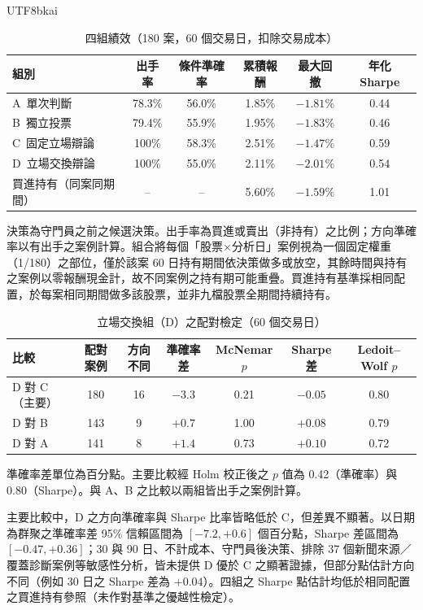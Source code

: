 \documentclass[12pt,a4paper]{article}
\newcommand{\grp}[1]{\textsf{#1}}
\begin{document}
\begin{CJK}{UTF8}{bkai}
\begin{table}[H]
\centering\small
\caption{四組績效（180 案，60 個交易日，扣除交易成本）}
\label{tab:main}
\begin{tabular}{@{}lccccc@{}}
\toprule
組別 & 出手率 & 條件準確率 & 累積報酬 & 最大回撤 & 年化 Sharpe \\
\midrule
\grp{A}\ 單次判斷 & 78.3\% & 56.0\% & 1.85\% & $-1.81\%$ & 0.44 \\
\grp{B}\ 獨立投票 & 79.4\% & 55.9\% & 1.95\% & $-1.83\%$ & 0.46 \\
\grp{C}\ 固定立場辯論 & 100\% & 58.3\% & 2.51\% & $-1.47\%$ & 0.59 \\
\grp{D}\ 立場交換辯論 & 100\% & 55.0\% & 2.11\% & $-2.01\%$ & 0.54 \\
\midrule
買進持有（同案同期間） & -- & -- & 5.60\% & $-1.59\%$ & 1.01 \\
\bottomrule
\end{tabular}
\par\smallskip
\raggedright\footnotesize 決策為守門員之前之候選決策。出手率為買進或賣出（非持有）之比例；方向準確率以有出手之案例計算。組合將每個「股票×分析日」案例視為一個固定權重（1/180）之部位，僅於該案 60 日持有期間依決策做多或放空，其餘時間與持有之案例以零報酬現金計，故不同案例之持有期可能重疊。買進持有基準採相同配置，於每案相同期間做多該股票，並非九檔股票全期間持續持有。
\end{table}

\begin{table}[H]
\centering\small
\caption{立場交換組（\grp{D}）之配對檢定（60 個交易日）}
\label{tab:tests}
\begin{tabular}{@{}lcccccc@{}}
\toprule
比較 & 配對案例 & 方向不同 & 準確率差 & McNemar $p$ & Sharpe 差 & Ledoit--Wolf $p$ \\
\midrule
\grp{D} 對 \grp{C}（主要） & 180 & 16 & $-3.3$ & 0.21 & $-0.05$ & 0.80 \\
\grp{D} 對 \grp{B} & 143 & 9 & $+0.7$ & 1.00 & $+0.08$ & 0.79 \\
\grp{D} 對 \grp{A} & 141 & 8 & $+1.4$ & 0.73 & $+0.10$ & 0.72 \\
\bottomrule
\end{tabular}
\par\smallskip
\raggedright\footnotesize 準確率差單位為百分點。主要比較經 Holm 校正後之 $p$ 值為 0.42（準確率）與 0.80（Sharpe）。與 \grp{A}、\grp{B} 之比較以兩組皆出手之案例計算。
\end{table}

主要比較中，\grp{D} 之方向準確率與 Sharpe 比率皆略低於 \grp{C}，但差異不顯著。以日期為群聚之準確率差 95\% 信賴區間為 $[-7.2, +0.6]$ 個百分點，Sharpe 差區間為 $[-0.47,+0.36]$；30 與 90 日、不計成本、守門員後決策、排除 37 個新聞來源／覆蓋診斷案例等敏感性分析，皆未提供 \grp{D} 優於 \grp{C} 之顯著證據，但部分點估計方向不同（例如 30 日之 Sharpe 差為 $+0.04$）。四組之 Sharpe 點估計均低於相同配置之買進持有參照（未作對基準之優越性檢定）。


\end{CJK}
\end{document}
